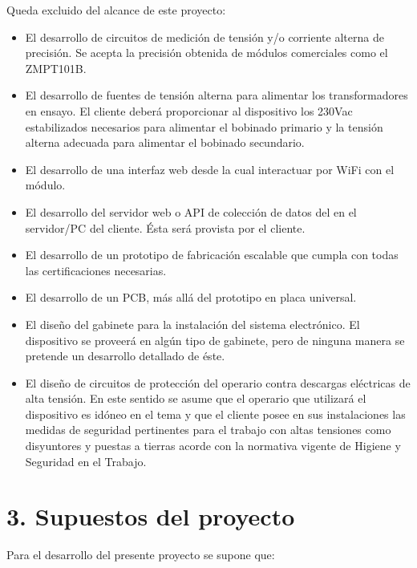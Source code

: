 \documentclass[11pt]{charter}
\begin{document}
Queda excluido del alcance de este proyecto:
\begin{itemize}
\item El desarrollo de circuitos de medición de tensión y/o corriente alterna de precisión. Se acepta la precisión obtenida de módulos comerciales como el ZMPT101B.
\item El desarrollo de fuentes de tensión alterna para alimentar los transformadores en ensayo. El cliente deberá proporcionar al dispositivo los 230Vac estabilizados necesarios para alimentar el bobinado primario y la tensión alterna adecuada para alimentar el bobinado secundario.
\item El desarrollo de una interfaz web desde la cual interactuar por WiFi con el módulo.
\item El desarrollo del servidor web o API de colección de datos del en el servidor/PC del cliente. Ésta será provista por el cliente.
\item El desarrollo de un prototipo de fabricación escalable que cumpla con todas las certificaciones necesarias.
\item El desarrollo de un PCB, más allá del prototipo en placa universal.
\item El diseño del gabinete para la instalación del sistema electrónico. El dispositivo se proveerá en algún tipo de gabinete, pero de ninguna manera se pretende un desarrollo detallado de éste.
\item El diseño de circuitos de protección del operario contra descargas eléctricas de alta tensión. En este sentido se asume que el operario que utilizará el dispositivo es idóneo en el tema y que el cliente posee en sus instalaciones las medidas de seguridad pertinentes para el trabajo con altas tensiones como disyuntores y puestas a tierras acorde con la normativa vigente de Higiene y Seguridad en el Trabajo.
\end{itemize}

\section{3. Supuestos del proyecto}
\label{sec:supuestos}


Para el desarrollo del presente proyecto se supone que:
\end{document}
